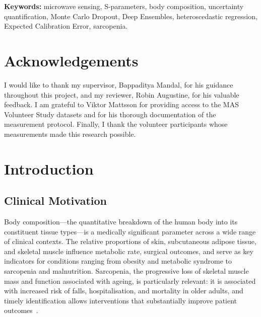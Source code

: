 \documentclass[12pt, a4paper, oneside]{report}
\begin{document}
\vspace{1em}
\noindent\textbf{Keywords:} microwave sensing, S-parameters, body composition, uncertainty quantification, Monte Carlo Dropout, Deep Ensembles, heteroscedastic regression, Expected Calibration Error, sarcopenia.

\chapter*{Acknowledgements}

I would like to thank my supervisor, Bappaditya Mandal, for his guidance throughout this project, and my reviewer, Robin Augustine, for his valuable feedback. I am grateful to Viktor Mattsson for providing access to the MAS Volunteer Study datasets and for his thorough documentation of the measurement protocol. Finally, I thank the volunteer participants whose measurements made this research possible.

\tableofcontents

\listoffigures
{}

\listoftables
{}


\chapter{Introduction}
\label{ch:intro}

\section{Clinical Motivation}

Body composition---the quantitative breakdown of the human body into its constituent tissue types---is a medically significant parameter across a wide range of clinical contexts. The relative proportions of skin, subcutaneous adipose tissue, and skeletal muscle influence metabolic rate, surgical outcomes, and serve as key indicators for conditions ranging from obesity and metabolic syndrome to sarcopenia and malnutrition. Sarcopenia, the progressive loss of skeletal muscle mass and function associated with ageing, is particularly relevant: it is associated with increased risk of falls, hospitalisation, and mortality in older adults, and timely identification allows interventions that substantially improve patient outcomes~\cite{sergi2016}.
\end{document}

